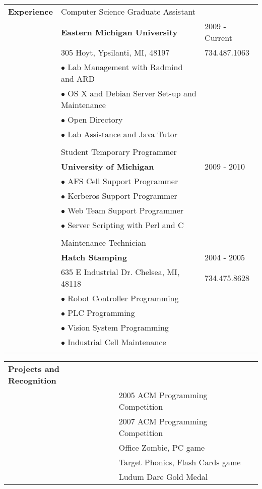 \documentclass[12pt,a4paper]{article}
\begin{document}
\begin{tabular}{ p{} p{} l  }
\textbf{Experience} &

Computer Science Graduate Assistant & \ \\
\ & \textbf{Eastern Michigan University} & 2009 - Current \\
\ & 305 Hoyt, Ypsilanti, MI, 48197 & 734.487.1063\\

\ & $\bullet$ Lab Management with Radmind and ARD & \ \\
\ & $\bullet$ OS X and Debian Server Set-up and Maintenance & \ \\
\ & $\bullet$ Open Directory & \ \\
\ & $\bullet$ Lab Assistance and Java Tutor & \ \\

\\
\ & Student Temporary Programmer & \ \\
\ &\textbf{University of Michigan} & 2009 - 2010 \\

\ & $\bullet$ AFS Cell Support Programmer & \ \\
\ & $\bullet$ Kerberos  Support Programmer & \ \\
\ & $\bullet$ Web Team Support Programmer & \ \\
\ & $\bullet$ Server Scripting with Perl and C & \ \\

\\
\ & Maintenance Technician & \ \\
\ &\textbf{Hatch Stamping} & 2004 - 2005 \\
\ & 635 E Industrial Dr. Chelsea, MI, 48118 & 734.475.8628 \\

\ & $\bullet$ Robot Controller Programming & \ \\
\ & $\bullet$ PLC Programming & \ \\
\ & $\bullet$ Vision System Programming & \ \\
\ & $\bullet$ Industrial Cell Maintenance & \ \\
\\
\end{tabular}

\begin{tabular}{  p{} p{} }
\textbf{Projects and Recognition} & \ \\
\ & 2005 ACM Programming Competition \\
\ & 2007 ACM Programming Competition \\
\ & Office Zombie, PC game \\
\ & Target Phonics, Flash Cards game \\
\ & Ludum Dare Gold Medal \\

\end{tabular}
\end{document}
